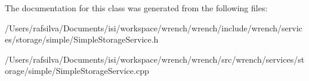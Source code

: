 The documentation for this class was generated from the following files\+:\begin{DoxyCompactItemize}
\item 
/\+Users/rafsilva/\+Documents/isi/workspace/wrench/wrench/include/wrench/services/storage/simple/Simple\+Storage\+Service.\+h\item 
/\+Users/rafsilva/\+Documents/isi/workspace/wrench/wrench/src/wrench/services/storage/simple/Simple\+Storage\+Service.\+cpp\end{DoxyCompactItemize}
